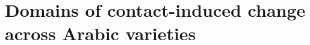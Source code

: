 \documentclass[output=book,modfonts,nonflat,collection,collectionchapter,%
		,%
	    ,multiauthors
        ,nobabel
        ,arseneau
		  ]{langsci/langscibook}
\begin{document}
 \part{Domains of contact-induced change across Arabic varieties}







\end{document}
